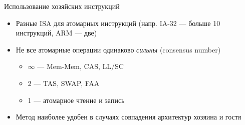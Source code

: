 \begin{frame}{Использование хозяйских инструкций}
\begin{itemize}
    \item Разные ISA для атомарных инструкций (напр. IA-32 --- больше 10 инструкций, ARM --- две)
    \item Не все атомарные операции одинаково \emph{сильны} (consensus number)~\cite{consensus-number}
    \begin{itemize}
        \item $\infty$ --- Mem-Mem, CAS, LL/SC
        \item 2 --- TAS, SWAP, FAA
        \item 1 --- атомарное чтение и запись
    \end{itemize}
    \item Метод наиболее удобен в случаях совпадения архитектур хозяина и гостя
\end{itemize}
\end{frame}

